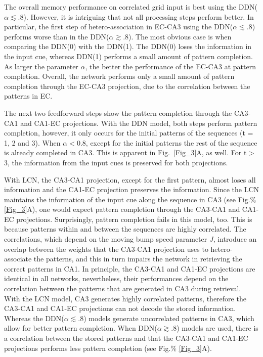 \documentclass[utf8]{frontiersSCNS} %
\begin{document}
The overall memory performance on correlated grid input is best using the DDN($\alpha \lesssim .8$). 
%
However, it is intriguing that not all processing steps perform better. 
%
In particular, the first step of hetero-association in EC-CA3 using the DDN($\alpha \lesssim .8$) performs worse than in the DDN($\alpha \gtrsim .8$). The most obvious case is when comparing the DDN(0) with the DDN(1).
%
The DDN(0) loses the information in the input cue, whereas DDN(1) performs a small amount of pattern completion.
%
As larger the parameter $\alpha$, the better the performance of the EC-CA3 at pattern completion.
%
Overall, the network performs only a small amount of pattern completion through the EC-CA3 projection, due to the correlation between the patterns in EC.
%

The next two feedforward steps show the pattern completion through the CA3-CA1 and CA1-EC projections. With the DDN model, both steps perform pattern completion, however, it only occurs for the initial patterns of the sequences (t = 1, 2 and 3). When $\alpha < 0.8$, except for the initial patterns the rest of the sequence is already completed in CA3. This is apparent in Fig.~\ref{Fig_3}A, as well.
%
For t > 3, the information from the input cues is preserved for both projections.
%

With LCN, the CA3-CA1 projection, except for the first pattern, almost loses all information and the CA1-EC projection preserves the information.
Since the LCN maintains the information of the input cue along the sequence in CA3 (see Fig.\% \ref{Fig_3}A), one would expect pattern completion through the CA3-CA1 and CA1-EC projections. Surprisingly, pattern completion fails in this model, too. This is because patterns within and between the sequences are highly correlated. The correlations, which depend on the moving bump speed parameter $J$, introduce an overlap between the weights that the CA3-CA1 projection uses to hetero-associate the patterns, and this in turn impairs the network in retrieving the correct patterns in CA1.
%
In principle, the CA3-CA1 and CA1-EC projections are identical in all networks, nevertheless, their performances depend on the correlation between the patterns that are generated in CA3 during retrieval. With the LCN model, CA3 generates highly correlated patterns, therefore the CA3-CA1 and CA1-EC projections can not decode the stored information. Whereas the DDN($\alpha \lesssim .8$) models generate uncorrelated patterns in CA3, which allow for better pattern completion. When DDN($\alpha \gtrsim .8$) models are used, there is a correlation between the stored patterns and that the CA3-CA1 and CA1-EC projections performs less pattern completion (see Fig.\% \ref{Fig_3}A).
\end{document}
